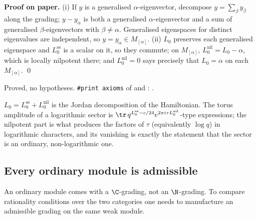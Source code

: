 \textbf{Proof on paper.} (i) If $y$ is a generalised $\alpha$-eigenvector, decompose $y = \sum_\beta y_\beta$
along the grading; $y - y_\alpha$ is both a generalised $\alpha$-eigenvector and a sum of generalised
$\beta$-eigenvectors with $\beta\neq\alpha$. Generalised eigenspaces for distinct eigenvalues are
independent, so $y = y_\alpha\in M_{[\alpha]}$. (ii) $L_0$ preserves each generalised eigenspace and
$L_0^{\mathrm{ss}}$ is a scalar on it, so they commute; on $M_{[\alpha]}$, $L_0^{\mathrm{nil}} = L_0-\alpha$,
which is locally nilpotent there; and $L_0^{\mathrm{nil}}=0$ says precisely that $L_0 = \alpha$ on each
$M_{[\alpha]}$. \qed

\begin{status}
Proved, no hypotheses. \texttt{\#print axioms} of  and
: .
\end{status}

\begin{physics}
$L_0 = L_0^{\mathrm{ss}} + L_0^{\mathrm{nil}}$ is the Jordan decomposition of the Hamiltonian. The torus
amplitude of a logarithmic sector is $\tr\, q^{L_0^{\mathrm{ss}}-c/24}e^{2\pi i\tau L_0^{\mathrm{nil}}}$-type
expressions; the nilpotent part is what produces the factors of $\tau$ (equivalently $\log q$) in logarithmic
characters, and its vanishing is exactly the statement that the sector is an ordinary, non-logarithmic one.
\end{physics}

\subsection{Every ordinary module is admissible}

An ordinary module comes with a $\C$-grading, not an $\N$-grading. To compare rationality
conditions over the two categories one needs to manufacture an admissible grading on the same weak
module.

